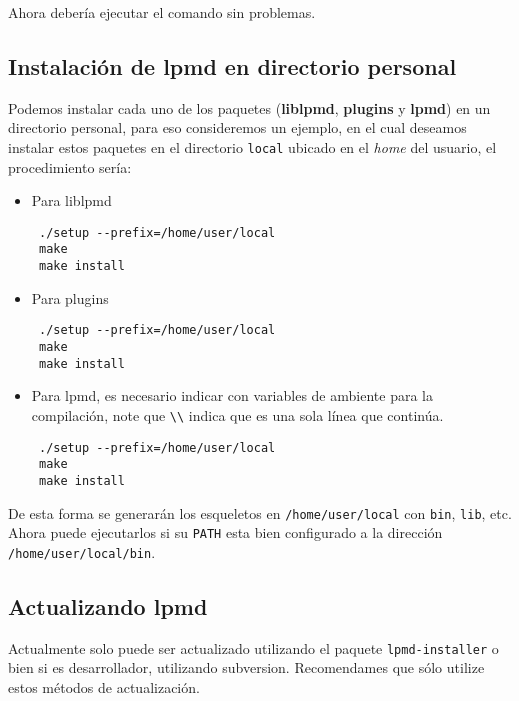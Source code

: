 Ahora deber\'ia ejecutar el comando sin problemas.

\subsection{Instalaci\'on de lpmd en directorio personal}
\label{subsub:personaldir}

Podemos instalar cada uno de los paquetes (\textbf{liblpmd}, \textbf{plugins} y \textbf{lpmd}) en un directorio personal, para eso consideremos un ejemplo, en el cual deseamos instalar estos paquetes en el directorio \verb|local| ubicado en el \textit{home} del usuario, el procedimiento ser\'ia:

\begin{itemize}
 \item Para liblpmd
 \begin{verbatim}
 ./setup --prefix=/home/user/local
 make
 make install
 \end{verbatim}
 \item Para plugins
 \begin{verbatim}
 ./setup --prefix=/home/user/local
 make
 make install
 \end{verbatim}
 \item Para lpmd, es necesario indicar con variables de ambiente para la compilaci\'on, note que \verb|\\| indica que es una sola l\'inea que contin\'ua.
 \begin{verbatim}
 ./setup --prefix=/home/user/local
 make
 make install
 \end{verbatim}
\end{itemize}

De esta forma se generar\'an los esqueletos en \verb|/home/user/local| con \verb|bin|, \verb|lib|, etc. Ahora puede ejecutarlos si su \verb|PATH| esta bien configurado a la direcci\'on \verb|/home/user/local/bin|.


\subsection{Actualizando lpmd}

 Actualmente {\lpmd} solo puede ser actualizado utilizando el paquete \verb|lpmd-installer| o bien si es desarrollador, utilizando subversion. Recomendames que s\'olo utilize estos m\'etodos de actualizaci\'on.

